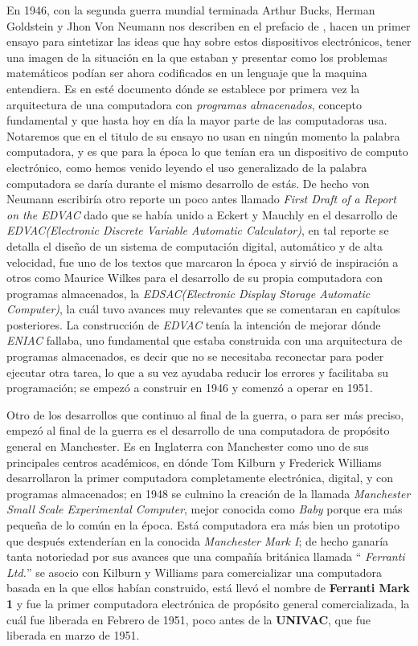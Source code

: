 \documentclass[letterpaper,12pt,oneside]{book}
\begin{document}
		En 1946, con la segunda guerra mundial terminada Arthur Bucks, Herman Goldstein y Jhon Von Neumann nos describen en el prefacio de \cite{randell_preliminary_1982}, 
		hacen
		un primer ensayo para sintetizar las ideas que hay sobre estos dispositivos electrónicos, tener una imagen de la situación en la que estaban y
		presentar como los problemas matemáticos podían ser ahora codificados en un lenguaje que la maquina entendiera. Es en esté documento dónde
		se establece por primera vez la arquitectura de una computadora con  \textit{programas almacenados}, concepto fundamental y que hasta hoy
		en día la mayor parte de las computadoras usa. Notaremos que en el titulo de su ensayo no usan en ningún momento la palabra computadora, y
		es que para la época lo que tenían era un dispositivo de computo electrónico, como hemos venido leyendo el uso generalizado de la palabra computadora
		se daría durante el mismo desarrollo de estás. De hecho von Neumann escribiría otro reporte un poco antes llamado \textit{First Draft of a Report on the EDVAC}
		dado que se había unido a Eckert y Mauchly en el desarrollo de
		\textit{EDVAC(Electronic Discrete Variable Automatic Calculator)}, en tal reporte se detalla el diseño de un sistema de computación digital, automático
		y de alta velocidad, fue uno de los textos que marcaron la época y sirvió de inspiración a otros como Maurice Wilkes para el desarrollo de su propia
		computadora con programas almacenados, la \textit{EDSAC(Electronic Display Storage Automatic Computer)}, la cuál tuvo avances muy relevantes que se
		comentaran en capítulos posteriores. La construcción de \textit{EDVAC} tenía la intención de mejorar dónde \textit{ENIAC} fallaba,
		uno fundamental que estaba construida con una arquitectura de programas almacenados, es decir que no se necesitaba reconectar para
		poder ejecutar otra tarea, lo que a su vez ayudaba reducir los errores y facilitaba su programación; se empezó a construir en 1946 y comenzó a operar en 
		1951\cite[p. 45]{oregan_brief_2012}.
		
		Otro de los desarrollos que continuo al final de la guerra, o para ser más preciso, empezó al final de la guerra es el desarrollo de una computadora
		de propósito general en Manchester. Es en Inglaterra con Manchester como uno de sus principales centros
		académicos, en dónde Tom Kilburn y Frederick Williams desarrollaron la primer computadora completamente electrónica, digital, y con programas almacenados;
		en 1948 se culmino la creación de la llamada \textit{Manchester Small Scale Experimental Computer}, mejor conocida como \textit{Baby}
		porque era más pequeña de lo común en la época. Está computadora era más bien un prototipo que después extenderían en la conocida \textit{Manchester Mark I}; de hecho
		ganaría tanta notoriedad por sus avances que una compañía británica
		llamada `` \textit{Ferranti Ltd.}'' se asocio con Kilburn y Williams para comercializar una computadora basada en la que ellos habían construido,
		está llevó el nombre  de \textbf{Ferranti Mark 1} y fue la primer computadora electrónica de propósito general comercializada, la cuál fue liberada
		en Febrero de 1951, poco antes de la \textbf{UNIVAC}, que fue liberada en marzo de 1951\cite[p. 36]{oregan_brief_2012}.
		
\end{document}
